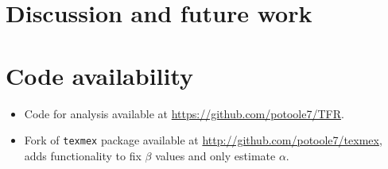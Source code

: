 \documentclass{article}
\numberwithin{equation}{section}
\begin{document}
\section{Discussion and future work}\label{sec:discussion}

\section{Code availability}

\begin{itemize}
  \item Code for analysis available at \url{https://github.com/potoole7/TFR}.
  \item Fork of \texttt{texmex} package available at \url{http://github.com/potoole7/texmex}, adds functionality to fix $\beta$ values and only estimate $\alpha$. 
\end{itemize}

\newpage

\end{document}
